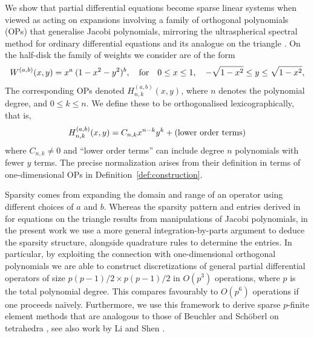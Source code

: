 \documentclass[11pt, oneside]{article}   	%
\newcommand{\sotodoinline}{\todo[color=green,inline=true]}
\newcommand{\hdop}{H}
\newcommand{\hdopnkab}{\hdop_{n,k}^{(a,b)}}
\begin{document}
We show that partial differential equations become sparse linear systems when viewed as acting on expansions involving a family of orthogonal polynomials (OPs) that  generalise Jacobi polynomials, mirroring the ultraspherical spectral method for ordinary differential equations \cite{olver2013fast} and its analogue on the triangle \cite{olver2018recurrence,olver2019triangle}.  On the half-disk the family of weights we consider are of the form
$$
W^{(a,b)}(x,y) = x^a \: (1-x^2-y^2)^b, \quad\hbox{for}\quad 0 \leq x \leq 1,\quad -\sqrt{1-x^2} \leq y \leq \sqrt{1-x^2},
$$
The corresponding OPs denoted $\hdopnkab(x,y)$, where $n$ denotes the polynomial degree, and $0 \le k \le n$. We define these to be orthogonalised lexicographically, that is,
$$
\hdopnkab(x,y) = C_{n,k} x^{n-k} y^k + (\hbox{lower order terms})
$$
where $C_{n,k} \neq 0$ and ``lower order terms'' can  include degree $n$ polynomials with fewer $y$ terms. The precise normalization arises from their definition in terms of one-dimensional OPs in Definition~\ref{def:construction}. 

Sparsity comes from expanding the domain and range of an operator  using different choices of $a$ and $b$. Whereas the sparsity pattern and entries derived in \cite{olver2018recurrence,olver2019triangle} for equations on the triangle  results from manipulations of Jacobi polynomials, in the present work we use a more general integration-by-parts argument to deduce the sparsity structure, alongside quadrature rules to determine the entries.  In particular, by exploiting the connection with one-dimensional orthogonal polynomials we are able to construct discretizations of general partial differential operators of size $p(p-1)/2 \times p(p-1)/2$ in $O(p^3)$ operations, where $p$ is the total polynomial degree. This compares favourably to $O(p^6)$ operations if one proceeds na\"ively. Furthermore, we use this framework to derive sparse $p$-finite element methods that are analogous to those of Beuchler and Sch\"oberl on tetrahedra \cite{beuchler2006new}, see also work by Li and Shen \cite{li2010optimal}.  


\end{document}
